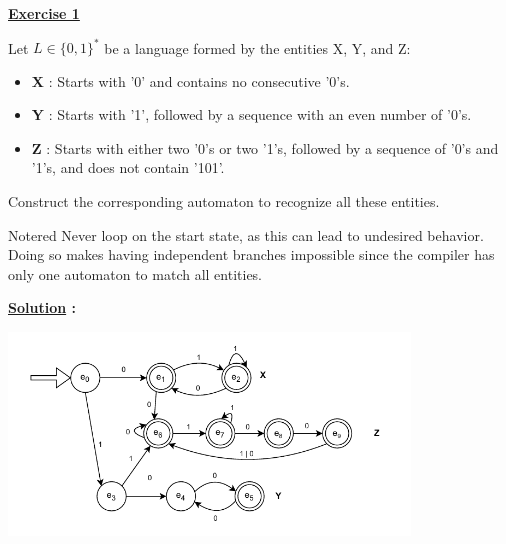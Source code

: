 
\begin{center}
    \Huge{\textbf{\underline{Exercise 1}}}
\end{center}

\vspace{0.5cm}

Let \( L \in \{0,1\}^{*} \) be a language formed by the entities X, Y, and Z:
\begin{itemize}
    \item \textbf{X} : Starts with '0' and contains no consecutive '0's.
    \item \textbf{Y} : Starts with '1', followed by a sequence with an even number of '0's.
    \item \textbf{Z} : Starts with either two '0's or two '1's, followed by a sequence of '0's and '1's, and does not contain '101'.
\end{itemize}

Construct the corresponding automaton to recognize all these entities.
\vspace{1cm}
\begin{prettyBox}{Note}{red}
Never loop on the start state, as this can lead to undesired behavior. Doing so makes having independent branches impossible since the
compiler has only one automaton to match all entities.
\end{prettyBox}

\vspace{1.5cm}

\textbf{\underline{\Large{Solution}} :}

\begin{center}
    \includegraphics[width=0.8\textwidth]{Exercices/EX1/ex1.drawio.pdf}
\end{center}


